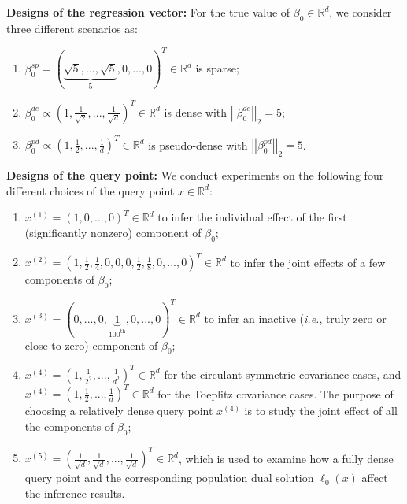 \documentclass[ejsv2,noshowframe]{imsart}
\theoremstyle{plain}
\theoremstyle{definition}
\theoremstyle{remark}
\newcommand{\norm}[1]{\left|\left| #1 \right|\right|}
\begin{document}
{\bf Designs of the regression vector:} For the true value of $\beta_0 \in \mathbb{R}^d$, we consider three different scenarios as:
\begin{enumerate}[label=(\roman*)]
	\item $\beta_0^{sp}=\left(\underbrace{\sqrt{5},...,\sqrt{5}}_5,0,...,0\right)^T \in \mathbb{R}^d$ is sparse;
	
	\item $\beta_0^{de}\propto \left(1,\frac{1}{\sqrt{2}},...,\frac{1}{\sqrt{d}}\right)^T \in \mathbb{R}^d$ is dense with $\norm{\beta_0^{de}}_2=5$;
	
	\item $\beta_0^{pd}\propto \left(1,\frac{1}{2},...,\frac{1}{d}\right)^T \in \mathbb{R}^d$ is pseudo-dense with $\norm{\beta_0^{pd}}_2=5$. 
\end{enumerate}


{\bf Designs of the query point:} We conduct experiments on the following four different choices of the query point $x\in \mathbb{R}^d$:
\begin{enumerate}[label=(\roman*)]
	\item $x^{(1)}=(1,0,...,0)^T\in \mathbb{R}^d$ to infer the individual effect of the first (significantly nonzero) component of $\beta_0$;
	
	\item $x^{(2)}=\left(1,\frac{1}{2},\frac{1}{4},0,0,0,\frac{1}{2},\frac{1}{8},0,...,0\right)^T\in\mathbb{R}^d$ to infer the joint effects of a few components of $\beta_0$;
	
	\item $x^{(3)}=\left(0,...,0,\underbrace{1}_{100^\text{th}},0,...,0\right)^T\in\mathbb{R}^d$ to infer an inactive (\emph{i.e.}, truly zero or close to zero) component of $\beta_0$;
	
	\item $x^{(4)} = \left(1,\frac{1}{2^2},...,\frac{1}{d^2}\right)^T \in \mathbb{R}^d$ for the circulant symmetric covariance cases, and $x^{(4)} = \left(1,\frac{1}{2},...,\frac{1}{d}\right)^T \in \mathbb{R}^d$ for the Toeplitz covariance cases. The purpose of choosing a relatively dense query point $x^{(4)}$ is to study the joint effect of all the components of $\beta_0$;
	
	\item $x^{(5)} = \left(\frac{1}{\sqrt{d}},\frac{1}{\sqrt{d}},...,\frac{1}{\sqrt{d}}\right)^T \in \mathbb{R}^d$, which is used to examine how a fully dense query point and the corresponding population dual solution $\ell_0(x)$ affect the inference results.
\end{enumerate}
\end{document}
